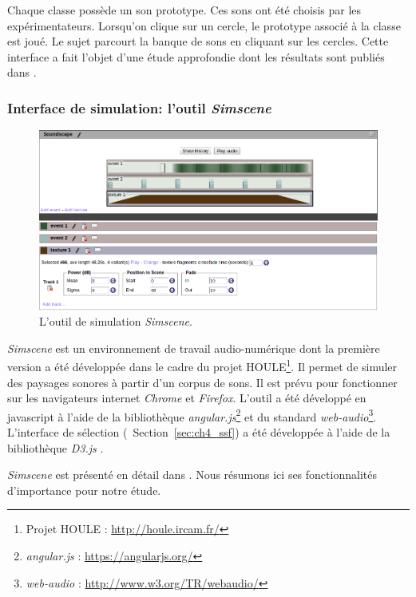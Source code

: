 Chaque classe possède un son prototype. Ces sons ont été choisis par les expérimentateurs. Lorsqu’on clique sur un cercle, le prototype associé à la classe est joué. Le sujet parcourt la banque de sons en cliquant sur les cercles. Cette interface a fait l'objet d'une étude approfondie dont les résultats sont publiés dans \citep{lafay2016JAES}.


\subsubsection{Interface de simulation: l'outil \emph{Simscene}}
\label{sec:ch4_simscene}

\begin{figure}[t]
        \myfloatalign
        \includegraphics[width=\linewidth]{gfx/ch_4/simscene}
       \caption{L'outil de simulation \emph{Simscene}.}\label{fig:simscene}
\end{figure}

\emph{Simscene} est un environnement de travail audio-numérique dont la première version a été développée dans le cadre du projet HOULE\footnote{Projet HOULE : \url{http://houle.ircam.fr/}}. Il permet de simuler des paysages sonores à partir d'un corpus de sons. Il est prévu pour fonctionner sur les navigateurs internet \emph{Chrome} et \emph{Firefox}. L'outil a été développé en javascript à l'aide de la bibliothèque \emph{angular.js}\footnote{\emph{angular.js} : \url{https://angularjs.org/}} et du standard \emph{web-audio}\footnote{\emph{web-audio} : \url{http://www.w3.org/TR/webaudio/}}. L'interface de sélection (\cf~Section~\ref{sec:ch4_ssf}) a été développée à l'aide de la bibliothèque \emph{D3.js} \citep{d32011}.

\emph{Simscene} est présenté en détail dans \citep{rossignol2015simscene}. Nous résumons ici ses fonctionnalités d'importance pour notre étude. 

